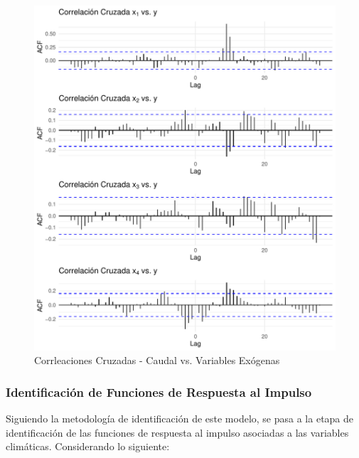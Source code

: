 \documentclass[12pt,oneside]{book}\usepackage[]{graphicx}\usepackage[]{color}
\makeatletter
\def\maxwidth{ %
  \ifdim\Gin@nat@width>\linewidth
    \linewidth
  \else
    \Gin@nat@width
  \fi
}
\newenvironment{knitrout}{}{} %
\theoremstyle{definition} %
\makeatother
\begin{document}
\begin{knitrout}
\color{fgcolor}\begin{figure}[H]

{\centering \includegraphics[width=\maxwidth]{figure/unnamed-chunk-35-1} 

}

\caption{\label{fig:cc_output} Corrleaciones Cruzadas - Caudal vs. Variables Exógenas}\label{fig:unnamed-chunk-35}
\end{figure}


\end{knitrout}




\newpage
\subsubsection{Identificación de Funciones de Respuesta al Impulso}

Siguiendo la metodología de identificación de este modelo, se pasa a la etapa de identificación de las funciones de respuesta al impulso asociadas a las variables climáticas. Considerando lo siguiente:
\end{document}

